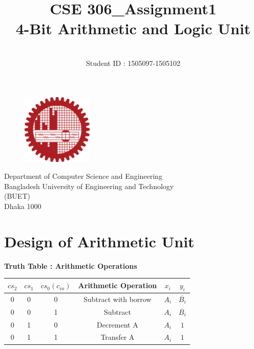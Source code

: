 \documentclass[]{article}
\title{CSE 306\_Assignment1 \\
4-Bit Arithmetic and Logic Unit}
\author{ \\ Student ID : 1505097-1505102}
\begin{document}
\maketitle

\vspace{5cm}

\begin{figure}[h!]
    \centering
    \includegraphics[width = 0.3\textwidth]{logo.png}
    \label{fig:bl}
\end{figure}
\begin{center}
   \Large{ Department of Computer Science and Engineering
 \\ Bangladesh University of Engineering and Technology
 \\ (BUET) \\
Dhaka 1000 \\}

\end{center}



\newpage
	\section{Design of Arithmetic Unit}
	
	\textbf{Truth Table : Arithmetic Operations}
	\begin{center}
		\begin{tabular}{ |c|c|c|c|c|c| } 
			\hline
			$cs_2$ & $cs_1$ & $cs_0(c_{in})$ & Arithmetic Operation & $x_i$ & $y_i$  \\
			\hline
			
			\hline
			0 & 0 & 0 & Subtract with borrow & $A_i$ & $\overline{B_i}$ \\
			\hline

			\hline
			0 & 0 & 1 & Subtract & $A_i$ &$\overline{B_i}$\\
			\hline
			
			\hline
			0 & 1 & 0 & Decrement A & $A_i$ & $1$ \\
			\hline
			
			\hline
			0 & 1 & 1 & Transfer A & $A_i$ & $1$ \\
			\hline
			
		\end{tabular}
	\end{center}
	
\end{document}
